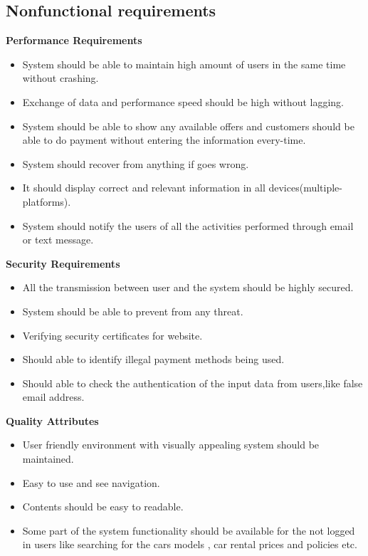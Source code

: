 \documentclass{article}
\begin{document}
    \subsection{Nonfunctional requirements}
        \textbf{Performance Requirements}
            \begin{itemize}
                \item System should be able to maintain high amount of users in the same time without crashing.
                \item Exchange of data and performance speed should be high without lagging.
                \item System should be able to show any available offers and customers should be able to do payment without entering the information every-time.
                \item System should recover from anything if goes wrong.
                \item It should display correct and relevant information in all devices(multiple-platforms).
                \item System should notify the users of all the activities performed through email or text message.
            \end{itemize}
        \textbf{Security Requirements}
            \begin{itemize}
                \item All the transmission between user and the system should be highly secured.
                \item System should be able to prevent from any threat.	
                \item Verifying security certificates for website.
                \item Should able to identify illegal payment methods being used.
                \item Should able to check the authentication of the input data from users,like false email address.
            \end{itemize}
        \textbf{Quality Attributes}
            \begin{itemize}
                \item User friendly environment with visually appealing system should be maintained.
                \item Easy to use and see navigation.
                \item Contents should be easy to readable.
                \item Some part of the system functionality should be available for the not logged in users like searching for the cars models , car rental prices and policies etc.
            \end{itemize}
\end{document}
